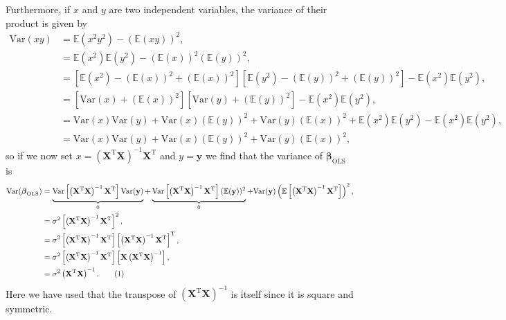 \documentclass[aps,pra,english,notitlepage,reprint,nofootinbib]{revtex4-1}  %
\newcommand\numberthis{\addtocounter{equation}{1}\tag{\theequation}}
\begin{document}
Furthermore, if $x$ and $y$ are two independent variables, the variance of their product is given by
\begin{align*}
\textrm{Var}(xy) &= \mathbb{E}(x^2y^2)-(\mathbb{E}(xy))^2, \\
&= \mathbb{E}(x^2)\mathbb{E}(y^2) - \left(\mathbb{E}(x)\right)^2\left(\mathbb{E}(y)\right)^2,
\\
&= \left[\mathbb{E}(x^2) - \left(\mathbb{E}(x)\right)^2 + \left(\mathbb{E}(x)\right)^2\right]\left[\mathbb{E}(y^2) - \left(\mathbb{E}(y)\right)^2 + \left(\mathbb{E}(y)\right)^2\right] - \mathbb{E}(x^2)\mathbb{E}(y^2),
\\
&= \left[\textrm{Var}(x) + \left(\mathbb{E}(x)\right)^2\right]\left[\textrm{Var}(y) + \left(\mathbb{E}(y)\right)^2\right] - \mathbb{E}(x^2)\mathbb{E}(y^2), \\
&= \textrm{Var}(x)\textrm{Var}(y) + \textrm{Var}(x)(\mathbb{E}(y))^2 + \textrm{Var}(y)(\mathbb{E}(x))^2 +\mathbb{E}(x^2)\mathbb{E}(y^2)- \mathbb{E}(x^2)\mathbb{E}(y^2),
\\
&= \textrm{Var}(x)\textrm{Var}(y) + \textrm{Var}(x)(\mathbb{E}(y))^2 + \textrm{Var}(y)(\mathbb{E}(x))^2,
\end{align*}
so if we now set $x=\left(\mathbf{X}^\textrm{T}\mathbf{X}\right)^{-1}\mathbf{X}^\textrm{T}$ and $y=\mathbf{y}$ we find that the variance of $\boldsymbol{\beta}_\textrm{OLS}$ is
\begin{align*}
\textrm{Var}(\boldsymbol{\beta}_\textrm{OLS}) 
&= \underbrace{\textrm{Var}\left[\left(\mathbf{X}^\textrm{T}\mathbf{X}\right)^{-1}\mathbf{X}^\textrm{T}\right]\textrm{Var}(\mathbf{y})}_0 
+ \underbrace{\textrm{Var}\left[\left(\mathbf{X}^\textrm{T}\mathbf{X}\right)^{-1}\mathbf{X}^\textrm{T}\right](\mathbb{E}(\mathbf{y}))^2}_{0} 
+ \textrm{Var}(\mathbf{y})\left(\mathbb{E}\left[\left(\mathbf{X}^\textrm{T}\mathbf{X}\right)^{-1}\mathbf{X}^\textrm{T}\right]\right)^2,
\\
&= \sigma^2\left[\left(\mathbf{X}^\textrm{T}\mathbf{X}\right)^{-1}\mathbf{X}^\textrm{T}\right]^2,
\\
&= \sigma^2\left[\left(\mathbf{X}^\textrm{T}\mathbf{X}\right)^{-1}\mathbf{X}^\textrm{T}\right]\left[\left(\mathbf{X}^\textrm{T}\mathbf{X}\right)^{-1}\mathbf{X}^\textrm{T}\right]^\textrm{T},
\\
&= \sigma^2\left[\left(\mathbf{X}^\textrm{T}\mathbf{X}\right)^{-1}\mathbf{X}^\textrm{T}\right]\left[\mathbf{X}\left(\mathbf{X}^\textrm{T}\mathbf{X}\right)^{-1}\right],
\\
&= \sigma^2\left(\mathbf{X}^\textrm{T}\mathbf{X}\right)^{-1}. \numberthis \label{appeq:var beta OLS}
\end{align*}
Here we have used that the transpose of $\left(\mathbf{X}^\textrm{T}\mathbf{X}\right)^{-1}$ is itself since it is square and symmetric.
\end{document}
